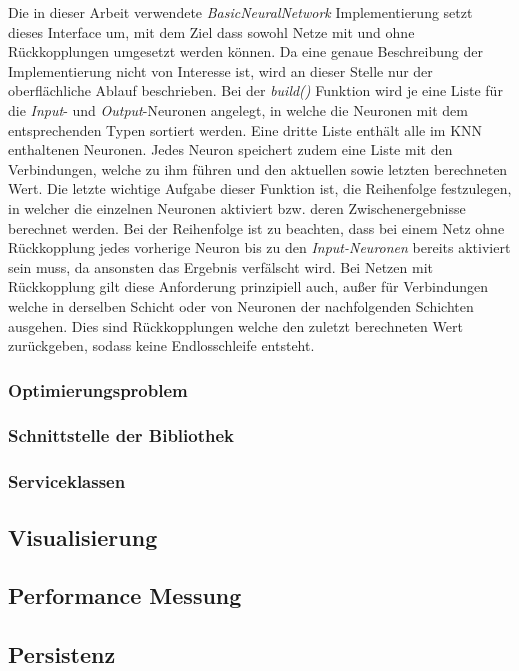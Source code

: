 Die in dieser Arbeit verwendete \emph{BasicNeuralNetwork} Implementierung setzt dieses Interface um, mit dem Ziel dass sowohl Netze mit und ohne Rückkopplungen umgesetzt werden können. Da eine genaue Beschreibung der Implementierung nicht von Interesse ist, wird an dieser Stelle nur der oberflächliche Ablauf beschrieben. Bei der \emph{build()} Funktion wird je eine Liste für die \emph{Input}- und \emph{Output}-Neuronen angelegt, in welche die Neuronen mit dem entsprechenden Typen sortiert werden. Eine dritte Liste enthält alle im \ac{KNN} enthaltenen Neuronen. Jedes Neuron speichert zudem eine Liste mit den Verbindungen, welche zu ihm führen und den aktuellen sowie letzten berechneten Wert. Die letzte wichtige Aufgabe dieser Funktion ist, die Reihenfolge festzulegen, in welcher die einzelnen Neuronen aktiviert bzw. deren Zwischenergebnisse berechnet werden. Bei der Reihenfolge ist zu beachten, dass bei einem Netz ohne Rückkopplung jedes vorherige Neuron bis zu den \emph{Input-Neuronen} bereits aktiviert sein muss, da ansonsten das Ergebnis verfälscht wird. Bei Netzen mit Rückkopplung gilt diese Anforderung prinzipiell auch, außer für Verbindungen welche in derselben Schicht oder von Neuronen der nachfolgenden Schichten ausgehen. Dies sind Rückkopplungen welche den zuletzt berechneten Wert zurückgeben, sodass keine Endlosschleife entsteht. 

\subsubsection{Optimierungsproblem}

\subsubsection{Schnittstelle der Bibliothek}
\subsubsection{Serviceklassen}
\subsection{Visualisierung}
\subsection{Performance Messung}
\subsection{Persistenz}


